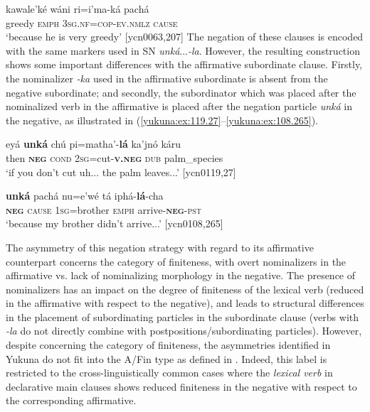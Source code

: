 \documentclass[output=paper,colorlinks,citecolor=brown]{langscibook}
\begin{document}
\ea\label{yukuna:ex:63.207}
 kawale'ké wáni ri=i'ma-ká pachá\\
{} greedy \textsc{emph} \textsc{3sg.nf=cop-ev.nmlz} \textsc{cause} \\
\glt ‘because he is very greedy’ [ycn0063,207]
\z
The negation of these clauses is encoded with the same markers used in SN \textit{unká}{...}\textit{-la}. However, the resulting construction shows some important differences with the affirmative subordinate clause. Firstly, the nominalizer \textit{-ka} used in the affirmative subordinate is absent from the negative subordinate; and secondly, the subordinator which was placed after the nominalized verb in the affirmative is placed after the negation particle \textit{unká} in the negative, as illustrated in (\ref{yukuna:ex:119.27}--\ref{yukuna:ex:108.265}).

\ea\label{yukuna:ex:119.27}
\gll eyá \textbf{unká} chú pi=matha'-\textbf{lá} ka'jnó káru\\
then \textbf{\textsc{neg}} \textsc{cond} \textsc{2sg}=cut-\textbf{\textsc{v.neg}} \textsc{dub} palm\_species  \\ 
\glt ‘if you don't cut uh{...} the palm leaves...’ [ycn0119,27]
\z

\ea\label{yukuna:ex:108.265}
\gll \textbf{unká} pachá nu=e'wé tá iphá-\textbf{lá}-cha \\
\textbf{\textsc{neg}} \textsc{cause} \textsc{1sg}=brother \textsc{emph} arrive-\textbf{\textsc{neg}}-\textsc{pst} \\
\glt ‘because my brother didn't arrive{...}’ [ycn0108,265]
\z

The asymmetry of this negation strategy with regard to its affirmative counterpart concerns the category of finiteness, with overt nominalizers in the affirmative vs. lack of nominalizing morphology in the negative. The presence of nominalizers has an impact on the degree of finiteness of the lexical verb (reduced in the affirmative with respect to the negative), and leads to structural differences in the placement of subordinating particles in the subordinate clause (verbs with \textit{-la} do not directly combine with postpositions/subordinating particles). However, despite concerning the category of finiteness, the asymmetries identified in Yukuna do not fit into the A/Fin type as defined in \citet[73]{Miestamo2005}. Indeed, this label is restricted to the cross-linguistically common cases where the \textit{lexical verb} in declarative main clauses shows reduced finiteness in the negative with respect to the corresponding affirmative. 
 
\end{document}
